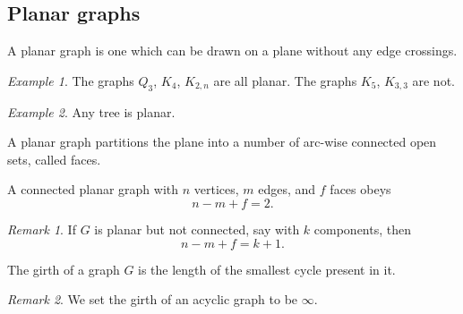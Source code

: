 \documentclass[11pt]{article}
\theoremstyle{definition}
\theoremstyle{remark}
\newtheorem*{remark}{Remark}
\newtheorem*{example}{Example}
\numberwithin{equation}{section}
\begin{document}
    \subsection{Planar graphs}
    \begin{definition}
        A planar graph is one which can be drawn on a plane without any edge
        crossings.
    \end{definition}

    \begin{example}
        The graphs $Q_3$, $K_4$, $K_{2, n}$ are all planar. The graphs $K_5$, $K_{3,
        3}$ are not.
    \end{example}
    \begin{example}
        Any tree is planar.
    \end{example}

    \begin{definition}
        A planar graph partitions the plane into a number of arc-wise connected open
        sets, called faces.
    \end{definition}

    \begin{theorem}[Euler]
        A connected planar graph with $n$ vertices, $m$ edges, and $f$ faces obeys \[
            n - m + f = 2.
        \] 
        \begin{remark}
            If $G$ is planar but not connected, say with $k$ components, then \[
                n - m + f = k + 1.
            \] 
        \end{remark}
    \end{theorem}

    \begin{definition}
        The girth of a graph $G$ is the length of the smallest cycle present in it.
        \begin{remark}
            We set the girth of an acyclic graph to be $\infty$.
        \end{remark}
    \end{definition}
\end{document}
